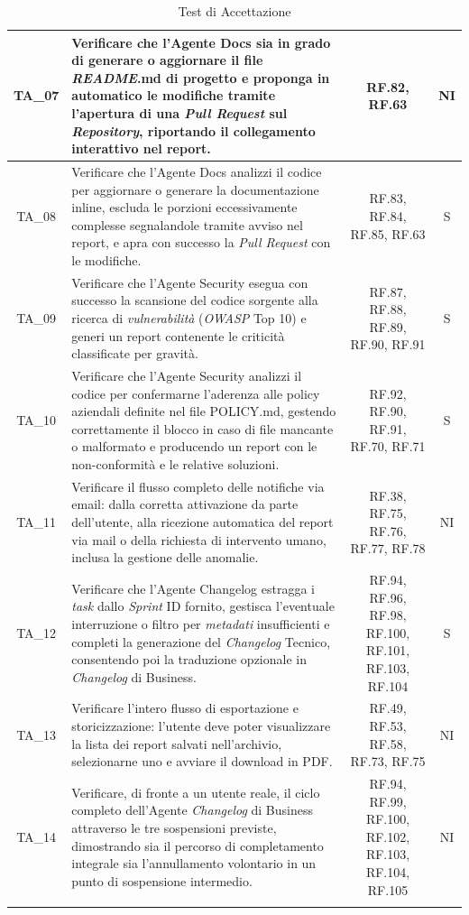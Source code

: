\documentclass[12pt, a4paper]{article}
\newlength{\LargColVal} %
\begin{document}
\begin{xltabular}{\textwidth}{|c|X|C{\LargColVal}|C{\LargColVal}|}
    TA\_07 & Verificare che l'Agente Docs sia in grado di generare o aggiornare il file \textit{README}.md di progetto e proponga in automatico le modifiche tramite l'apertura di una \textit{Pull Request} sul \textit{Repository}, riportando il collegamento interattivo nel report. & RF.82, RF.63 & NI \\ \hline

    TA\_08 & Verificare che l'Agente Docs analizzi il codice per aggiornare o generare la documentazione inline, escluda le porzioni eccessivamente complesse segnalandole tramite avviso nel report, e apra con successo la \textit{Pull Request} con le modifiche. & RF.83, RF.84, RF.85, RF.63 & S \\ \hline

    TA\_09 & Verificare che l'Agente Security esegua con successo la scansione del codice sorgente alla ricerca di \textit{vulnerabilità} (\textit{OWASP} Top 10) e generi un report contenente le criticità classificate per gravità. & RF.87, RF.88, RF.89, RF.90, RF.91 & S \\ \hline

    TA\_10 & Verificare che l'Agente Security analizzi il codice per confermarne l'aderenza alle policy aziendali definite nel file POLICY.md, gestendo correttamente il blocco in caso di file mancante o malformato e producendo un report con le non-conformità e le relative soluzioni. & RF.92, RF.90, RF.91, RF.70, RF.71 & S \\ \hline

    TA\_11 & Verificare il flusso completo delle notifiche via email: dalla corretta attivazione da parte dell'utente, alla ricezione automatica del report via mail o della richiesta di intervento umano, inclusa la gestione delle anomalie. & RF.38, RF.75, RF.76, RF.77, RF.78 & NI \\ \hline

    TA\_12 & Verificare che l'Agente Changelog estragga i \textit{task} dallo \textit{Sprint} ID fornito, gestisca l'eventuale interruzione o filtro per \textit{metadati} insufficienti e completi la generazione del \textit{Changelog} Tecnico, consentendo poi la traduzione opzionale in \textit{Changelog} di Business. & RF.94, RF.96, RF.98, RF.100, RF.101, RF.103, RF.104 & S \\ \hline

    TA\_13 & Verificare l'intero flusso di esportazione e storicizzazione: l'utente deve poter visualizzare la lista dei report salvati nell'archivio, selezionarne uno e avviare il download in PDF. & RF.49, RF.53, RF.58, RF.73, RF.75 & NI \\ \hline

    TA\_14 & Verificare, di fronte a un utente reale, il ciclo completo dell'Agente \textit{Changelog} di Business attraverso le tre sospensioni previste, dimostrando sia il percorso di completamento integrale sia l'annullamento volontario in un punto di sospensione intermedio. & RF.94, RF.99, RF.100, RF.102, RF.103, RF.104, RF.105 & NI \\ \hline

    \caption{Test di Accettazione}
    \label{tab:test_accettazione}
\end{xltabular}
\end{document}
